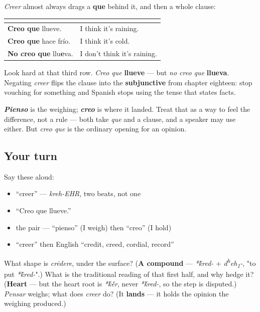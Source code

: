 \begin{grammarlens}[title={Grammar Lens: creer que}]
\emph{Creer} almost always drags a \textbf{que} behind it, and then a whole clause:

\noindent
\begin{tabularx}{\linewidth}{@{}>{\raggedright\arraybackslash}X>{\raggedright\arraybackslash}X@{}}
\toprule
\textbf{} & \textbf{} \\
\midrule
\textbf{Creo que} llueve. & I think it's raining. \\
\textbf{Creo que} hace frío. & I think it's cold. \\
\textbf{No creo que} llu\textbf{e}va. & I don't think it's raining. \\
\bottomrule
\end{tabularx}

Look hard at that third row. \emph{Creo que} \textbf{llueve} — but \emph{no creo que} \textbf{llueva}. Negating \emph{creer} flips the clause into the \textbf{subjunctive} from chapter eighteen: stop vouching for something and Spanish stops using the tense that states facts.

\emph{\textbf{Pienso}} is the weighing; \emph{\textbf{creo}} is where it landed. Treat that as a way to feel the difference, not a rule — both take \emph{que} and a clause, and a speaker may use either. But \emph{creo que} is the ordinary opening for an opinion.
\end{grammarlens}

\subsection*{Your turn}
Say these aloud:

\begin{itemize}
\raggedright
  \item \textquotedblleft{}creer\textquotedblright{} — \emph{kreh-EHR}, two beats, not one
  \item \textquotedblleft{}Creo que llueve.\textquotedblright{}
  \item the pair — \textquotedblleft{}pienso\textquotedblright{} (I weigh) then \textquotedblleft{}creo\textquotedblright{} (I hold)
  \item \textquotedblleft{}creer\textquotedblright{} then English \textquotedblleft{}credit, creed, cordial, record\textquotedblright{}
\end{itemize}

\begin{tcolorbox}[breakable,colback=teal!4,colframe=teal!35!black,title={Before you move on}]
What shape is \emph{crēdere}, under the surface? (\textbf{A compound} — \emph{*\'{k}red-} + \emph{d\textsuperscript{h}eh\textsubscript{1}-}, "to put \emph{*\'{k}red-}".) What is the traditional reading of that first half, and why hedge it? (\textbf{Heart} — but the heart root is \emph{*\'{k}\'{\={e}}r}, never \emph{*\'{k}red-}, so the step is disputed.) \emph{Pensar} weighs; what does \emph{creer} do? (It \textbf{lands} — it holds the opinion the weighing produced.)
\end{tcolorbox}
